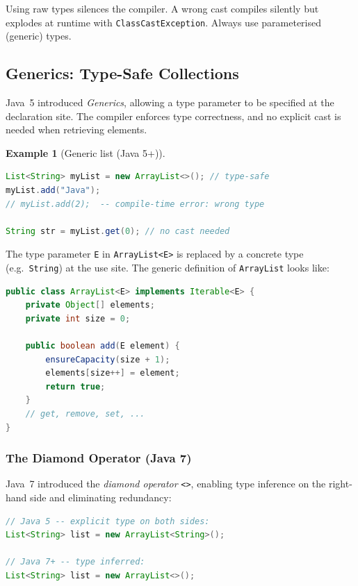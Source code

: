 \documentclass[11pt, a4paper, notitlepage]{report}
\theoremstyle{definition}
\theoremstyle{remark}
\theoremstyle{definition}
\newtheorem{example}[theorem]{Example}
\begin{document}
\begin{warning}[title={Warning: Raw Types}]
Using raw types silences the compiler.  A wrong cast compiles silently but explodes
at runtime with \texttt{ClassCastException}.  Always use parameterised (generic) types.
\end{warning}

\subsection{Generics: Type-Safe Collections}
\label{subsec:ch10-generics-solution}

Java~5 introduced \emph{Generics}, allowing a type parameter to be specified at the
declaration site.  The compiler enforces type correctness, and no explicit cast is needed
when retrieving elements.

\begin{example}[Generic list (Java 5+)]
\leavevmode
\begin{lstlisting}[language=Java]
List<String> myList = new ArrayList<>(); // type-safe
myList.add("Java");
// myList.add(2);  -- compile-time error: wrong type

String str = myList.get(0); // no cast needed
\end{lstlisting}
\end{example}

The type parameter \texttt{E} in \texttt{ArrayList<E>} is replaced by a concrete type
(e.g.\ \texttt{String}) at the use site.  The generic definition of \texttt{ArrayList}
looks like:

\begin{lstlisting}[language=Java]
public class ArrayList<E> implements Iterable<E> {
    private Object[] elements;
    private int size = 0;

    public boolean add(E element) {
        ensureCapacity(size + 1);
        elements[size++] = element;
        return true;
    }
    // get, remove, set, ...
}
\end{lstlisting}

\subsubsection{The Diamond Operator (Java 7)}
Java~7 introduced the \emph{diamond operator} \texttt{<>}, enabling type inference on the
right-hand side and eliminating redundancy:

\begin{lstlisting}[language=Java]
// Java 5 -- explicit type on both sides:
List<String> list = new ArrayList<String>();

// Java 7+ -- type inferred:
List<String> list = new ArrayList<>();
\end{lstlisting}
\end{document}
